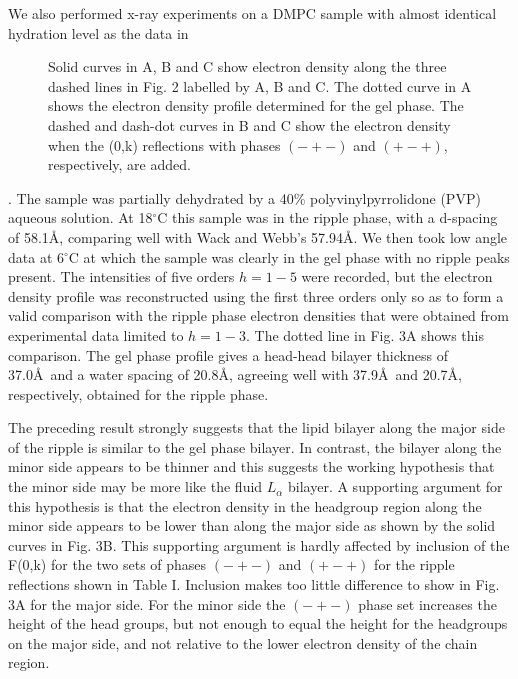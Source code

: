 We also performed x-ray experiments on a DMPC sample with almost identical
hydration level as the data in  

\begin{figure}[t]
\centerline {}
\vspace{11pt}
\caption{Solid curves in A, B and C show electron density along the three 
dashed lines in Fig. 2 labelled by A, B and C.  The dotted curve in
A shows the electron density profile determined for the gel phase.
The dashed and dash-dot curves in B and C show the electron density when
the (0,k) reflections with phases $(-+-)$ and $(+-+)$, respectively, are
added.
\label{Fig3}}
\end{figure}

\noindent
\cite{Wac89a}.
The sample was partially dehydrated by a 40\% polyvinylpyrrolidone
(PVP) aqueous solution.  At 18$^{\circ}$C
this sample was in the ripple phase, with a d-spacing of 58.1\AA, comparing 
well with Wack and Webb's 57.94\AA.  We then took
low angle data at 6$^{\circ}$C at which the sample was clearly in the
gel phase with no ripple peaks present. The intensities of five 
orders $h=1-5$ were
recorded, but the electron density profile was reconstructed using
the first three orders only so as to form a valid comparison 
with the ripple phase electron densities that were obtained from 
experimental data limited to $h=1-3$.  
The dotted line in Fig. 3A shows this comparison.
The gel phase profile gives a head-head bilayer thickness of 37.0\AA\ and
a water spacing of 20.8\AA, agreeing well with 37.9\AA\ and 20.7\AA,
respectively, obtained for the ripple phase.

The preceding result strongly suggests that the lipid bilayer along the major
side of the ripple is similar to the gel phase bilayer.
In contrast, the bilayer along the minor side appears to be
thinner and this suggests the working hypothesis that the
minor side may be more like the fluid $L_{\alpha}$ bilayer.
A supporting argument for this hypothesis is that the electron density 
in the headgroup region along the minor side appears to be lower than 
along the major side as shown by the solid curves in Fig. 3B.  
This supporting argument is hardly affected by inclusion of the
F(0,k) for the two sets of phases $(-+-)$ and $(+-+)$ for the ripple 
reflections shown in Table I.  Inclusion makes too little difference 
to show in Fig. 3A for the major side.  For the minor side the 
$(-+-)$ phase set increases the height of the head groups, but not
enough to equal the height for the headgroups on the
major side, and not relative to the lower electron density of the 
chain region.

